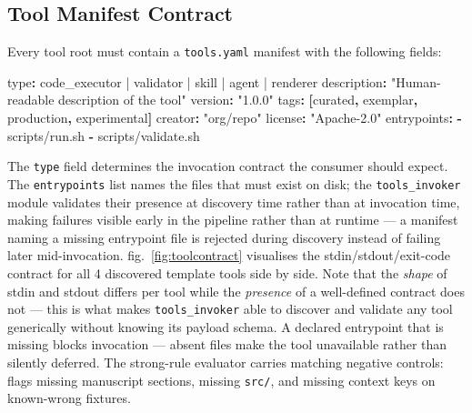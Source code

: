 \documentclass[
]{article}
\newenvironment{Shaded}{}{}
\newcommand{\AttributeTok}[1]{\textcolor[rgb]{0.49,0.56,0.16}{#1}}
\newcommand{\FunctionTok}[1]{\textcolor[rgb]{0.02,0.16,0.49}{#1}}
\newcommand{\KeywordTok}[1]{\textcolor[rgb]{0.00,0.44,0.13}{\textbf{#1}}}
\newcommand{\StringTok}[1]{\textcolor[rgb]{0.25,0.44,0.63}{#1}}
\begin{document}
\subsection{Tool Manifest Contract}\label{tool-manifest-contract}

Every tool root must contain a \texttt{tools.yaml} manifest with the
following fields:

\begin{Shaded}
\begin{Highlighting}[]
\FunctionTok{type}\KeywordTok{:}\AttributeTok{ code\_executor | validator | skill | agent | renderer}
\FunctionTok{description}\KeywordTok{:}\AttributeTok{ }\StringTok{"Human{-}readable description of the tool"}
\FunctionTok{version}\KeywordTok{:}\AttributeTok{ }\StringTok{"1.0.0"}
\FunctionTok{tags}\KeywordTok{:}\AttributeTok{ }\KeywordTok{[}\AttributeTok{curated}\KeywordTok{,}\AttributeTok{ exemplar}\KeywordTok{,}\AttributeTok{ production}\KeywordTok{,}\AttributeTok{ experimental}\KeywordTok{]}
\FunctionTok{creator}\KeywordTok{:}\AttributeTok{ }\StringTok{"org/repo"}
\FunctionTok{license}\KeywordTok{:}\AttributeTok{ }\StringTok{"Apache{-}2.0"}
\FunctionTok{entrypoints}\KeywordTok{:}
\AttributeTok{  }\KeywordTok{{-} }\AttributeTok{scripts/run.sh}
\AttributeTok{  }\KeywordTok{{-} }\AttributeTok{scripts/validate.sh}
\end{Highlighting}
\end{Shaded}

The \texttt{type} field determines the invocation contract the consumer
should expect. The \texttt{entrypoints} list names the files that must
exist on disk; the \texttt{tools\_invoker} module validates their
presence at discovery time rather than at invocation time, making
failures visible early in the pipeline rather than at runtime --- a
manifest naming a missing entrypoint file is rejected during discovery
instead of failing later mid-invocation. fig.~\ref{fig:toolcontract}
visualises the stdin/stdout/exit-code contract for all 4 discovered
template tools side by side. Note that the \emph{shape} of stdin and
stdout differs per tool while the \emph{presence} of a well-defined
contract does not --- this is what makes \texttt{tools\_invoker} able to
discover and validate any tool generically without knowing its payload
schema. A declared entrypoint that is missing blocks invocation ---
absent files make the tool unavailable rather than silently deferred.
The strong-rule evaluator carries matching negative controls:
 flags missing
manuscript sections, missing \texttt{src/}, and missing context keys on
known-wrong fixtures.
\end{document}
